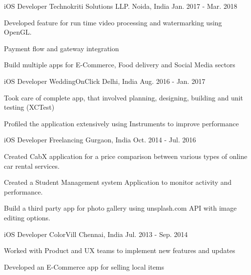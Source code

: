 \begin{cventries}

\cventry
{iOS Developer} %
{Technokriti Solutions LLP.} %
{Noida, India} %
{Jan. 2017 - Mar. 2018} %
{ %
\begin{cvitems}
\item {Developed feature for run time video processing and watermarking using OpenGL.}
\item {Payment flow and gateway integration}
\item {Build multiple apps for E-Commerce, Food delivery and Social Media sectors }
\end{cvitems} 
}
\bigskip


\cventry
{iOS Developer} %
{WeddingOnClick} %
{Delhi, India} %
{Aug. 2016 - Jan. 2017} %
{ %
\begin{cvitems}
\item {Took care of complete app, that involved planning, designing, building and unit testing (XCTest)}
\item {Profiled the application extensively using Instruments to improve performance}
\end{cvitems}
}
\bigskip


\cventry
{iOS Developer} %
{Freelancing} %
{Gurgaon, India} %
{Oct. 2014 - Jul. 2016} %
{ %
\begin{cvitems}
\item {Created CabX application for a price comparison between various types of online car rental services.}
\item {Created a Student Management system Application to monitor activity and performance.}
\item {Build a third party app for photo gallery using unsplash.com API with image editing options.}
\end{cvitems}
}
\bigskip


\cventry
{iOS Developer} %
{ColorVill} %
{Chennai, India} %
{Jul. 2013 - Sep. 2014} %
{ %
\begin{cvitems}
\item {Worked with Product and UX teams to implement new features and updates}
\item {Developed an E-Commerce app for selling local items}
\end{cvitems}
}


\end{cventries}